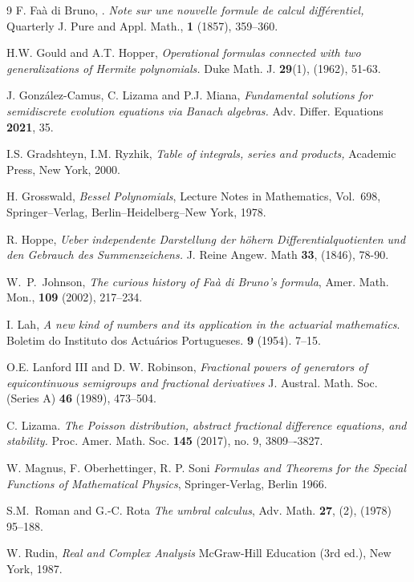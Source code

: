 \documentclass[a4paper,12pt]{amsart}
\theoremstyle{definition}
\theoremstyle{remark}
\begin{document}
\begin{thebibliography}{9}
 F. Fa\`a di Bruno, . {\it Note sur une nouvelle formule de calcul diff\'erentiel,}
{Quarterly J. Pure and Appl. Math.},  {\bf 1}  (1857), 359--360.

 H.W. Gould and A.T. Hopper, {\it Operational formulas connected with two generalizations of Hermite polynomials. } {Duke Math. J.} \textbf{29}(1), ({1962}), 51-63.


 J. González-Camus, C. Lizama and P.J. Miana, {\it Fundamental solutions for semidiscrete evolution equations via Banach algebras. } {Adv. Differ. Equations} \textbf{2021}, 35.

 I.S. Gradshteyn, I.M. Ryzhik, {\it Table of integrals, series and products,} Academic Press, New York, 2000.

 H. Grosswald,
{\it Bessel Polynomials},
Lecture Notes in Mathematics, Vol.~698,
Springer--Verlag, Berlin--Heidelberg--New York, 1978.



 R. Hoppe, {\it Ueber independente Darstellung der höhern Differentialquotienten und den Gebrauch des Summenzeichens. } {J. Reine Angew. Math} \textbf{33}, ({1846}), 78-90.

W.~P.~Johnson,
{\it The curious history of Fa\`a di Bruno's formula},
{Amer. Math. Mon.}, {\bf 109} (2002), 217--234.



  I. Lah, {\it A new kind of numbers and its application in the actuarial mathematics}. Boletim do Instituto dos Actuários Portugueses. {\bf 9} (1954). 7–15.

 O.E. Lanford III and D. W. Robinson, {\it  Fractional powers of  generators of equicontinuous semigroups and fractional derivatives}
J. Austral. Math. Soc. (Series A) {\bf 46} (1989), 473--504.


 C. Lizama. {\it The Poisson distribution, abstract fractional difference equations, and stability.} Proc. Amer. Math. Soc. {\bf 145} (2017), no. 9, 3809–-3827.


 W. Magnus, F. Oberhettinger, R. P. Soni {\it Formulas and Theorems for the Special Functions of Mathematical Physics}, Springer-Verlag, Berlin  1966.

S.M.~Roman and G.-C. Rota
{\it The  umbral calculus},
Adv. Math. \textbf{27}, (2), (1978)  95--188.



 W. Rudin, {\it Real and Complex Analysis}
    McGraw-Hill Education (3rd ed.), New York,  1987.



\end{thebibliography}
\end{document}
